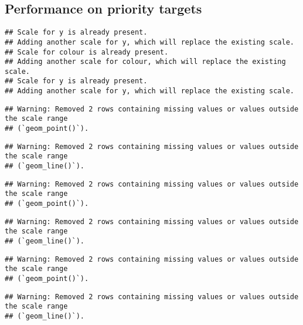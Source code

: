 \documentclass{article}
\begin{document}
\hypertarget{performance-on-priority-targets}{%
\subsection{Performance on priority
targets}\label{performance-on-priority-targets}}

\begin{Shaded}
\begin{Highlighting}[]
\SpecialCharTok{$}\SpecialCharTok{$}
\end{Highlighting}
\end{Shaded}

\begin{verbatim}
## Scale for y is already present.
## Adding another scale for y, which will replace the existing scale.
## Scale for colour is already present.
## Adding another scale for colour, which will replace the existing scale.
## Scale for y is already present.
## Adding another scale for y, which will replace the existing scale.
\end{verbatim}

\begin{verbatim}
## Warning: Removed 2 rows containing missing values or values outside the scale range
## (`geom_point()`).
\end{verbatim}

\begin{verbatim}
## Warning: Removed 2 rows containing missing values or values outside the scale range
## (`geom_line()`).
\end{verbatim}

\begin{verbatim}
## Warning: Removed 2 rows containing missing values or values outside the scale range
## (`geom_point()`).
\end{verbatim}

\begin{verbatim}
## Warning: Removed 2 rows containing missing values or values outside the scale range
## (`geom_line()`).
\end{verbatim}

\begin{verbatim}
## Warning: Removed 2 rows containing missing values or values outside the scale range
## (`geom_point()`).
\end{verbatim}

\begin{verbatim}
## Warning: Removed 2 rows containing missing values or values outside the scale range
## (`geom_line()`).
\end{verbatim}
\end{document}

